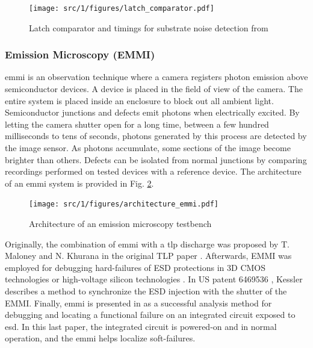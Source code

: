\begin{figure}[!h]
  \centering
  \texttt{[image: src/1/figures/latch\_comparator.pdf]}
  \caption{Latch comparator and timings for substrate noise detection from \cite{}}
  \label{fig:noise-detect-latch-comparator}
\end{figure}


\subsubsection{Emission Microscopy (EMMI)}

\gls{emmi} is an observation technique where a camera registers photon emission above semiconductor devices.
A device is placed in the field of view of the camera.
The entire system is placed inside an enclosure to block out all ambient light.
Semiconductor junctions and defects emit photons when electrically excited.
By letting the camera shutter open for a long time, between a few hundred milliseconds to tens of seconds, photons generated by this process are detected by the image sensor.
As photons accumulate, some sections of the image become brighter than others.
Defects can be isolated from normal junctions by comparing recordings performed on tested devices with a reference device.
The architecture of an \gls{emmi} system is provided in Fig. \ref{fig:emmi}.

\begin{figure}[!h]
  \centering
  \texttt{[image: src/1/figures/architecture\_emmi.pdf]}
  \caption{Architecture of an emission microscopy testbench}
  \label{fig:emmi}
\end{figure}

Originally, the combination of \gls{emmi} with a \gls{tlp} discharge was proposed by T. Maloney and N. Khurana in the original TLP paper \cite{TLP}.
Afterwards, EMMI was employed for debugging hard-failures of ESD protections in 3D CMOS technologies \cite{kessler2002method} or high-voltage silicon technologies \cite{emmi-tlp}.
In US patent 6469536 \cite{kessler2002method}, Kessler describes a method to synchronize the ESD injection with the shutter of the EMMI.
Finally, \gls{emmi} is presented in \cite{softfailEMMI} as a successful analysis method for debugging and locating a functional failure on an integrated circuit exposed to \gls{esd}.
In this last paper, the integrated circuit is powered-on and in normal operation, and the \gls{emmi} helps localize soft-failures.

